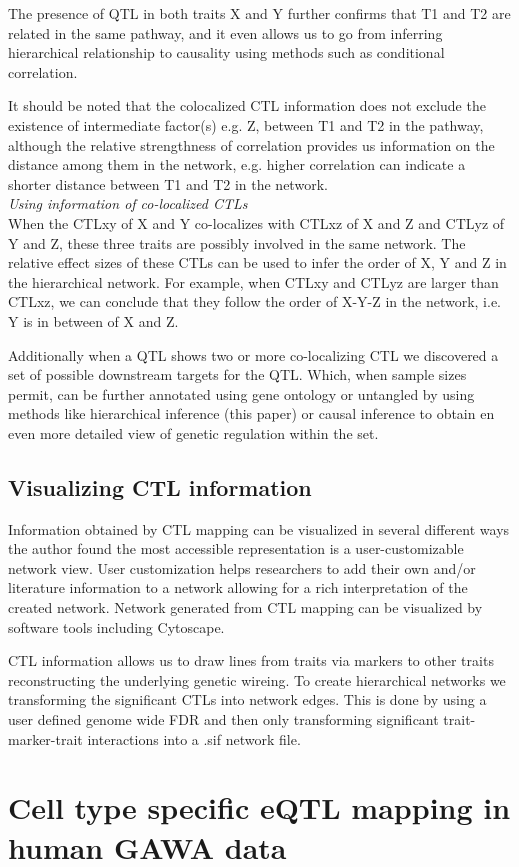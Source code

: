   The presence of QTL in both traits X and Y further confirms that T1 and T2 are related in the same pathway, and it 
  even allows us to go from inferring hierarchical relationship to causality using methods such as conditional 
  correlation\cite{Schadt:2007, Li:2010}.

  It should be noted that the colocalized CTL information does not exclude the existence of intermediate factor(s) 
  e.g. Z,  between T1 and T2 in the pathway, although the relative strengthness of correlation provides us 
  information on the distance among them in the network, e.g. higher correlation can indicate a shorter distance 
  between T1 and T2 in the network.\\

  \emph{Using information of co-localized CTLs}\\
  When the CTLxy of X and Y co-localizes with CTLxz of X and Z and CTLyz of Y and Z, these three traits are possibly 
  involved in the same network. The relative effect sizes of these CTLs can be used to infer the order of X, Y and Z
  in the hierarchical network. For example, when CTLxy and CTLyz are larger than CTLxz, we can conclude that they 
  follow the order of X-Y-Z in the network, i.e. Y is in between of X and Z.

  Additionally when a QTL shows two or more co-localizing CTL we discovered a set of possible downstream targets 
  for the QTL. Which, when sample sizes permit, can be further annotated using gene ontology\cite{GeneOntology:2000} or 
  untangled by using methods like hierarchical inference (this paper) or causal inference\cite{Schadt:2005, Li:2006} 
  to obtain en even more detailed view of genetic regulation within the set.

  \subsection{Visualizing CTL information}
  Information obtained by CTL mapping can be visualized in several different ways the author found the most accessible 
  representation is a user-customizable network view. User customization helps researchers to add their own and/or 
  literature information to a network allowing for a rich interpretation of the created network. Network generated from 
  CTL mapping can be visualized by software tools including Cytoscape\cite{Cytoscape:2010, Cytoscape:2003}.

  CTL information allows us to draw lines from traits via markers to other traits reconstructing the underlying genetic 
  wireing. To create hierarchical networks we transforming the significant CTLs into network edges. This is done by 
  using a user defined genome wide FDR and then only transforming significant trait-marker-trait interactions into a 
  .sif network file.

\section{Cell type specific eQTL mapping in human GAWA data}
\label{sec:cellspecificeqtl}

